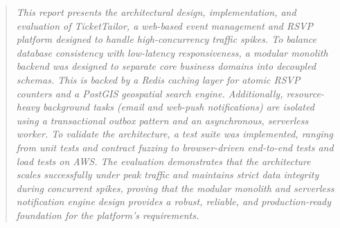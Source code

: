 \begin{abstract}
\textit{This report presents the architectural design, implementation, and evaluation of TicketTailor, a web-based event management and RSVP platform designed to handle high-concurrency traffic spikes. To balance database consistency with low-latency responsiveness, a modular monolith backend was designed to separate core business domains into decoupled schemas. This is backed by a Redis caching layer for atomic RSVP counters and a PostGIS geospatial search engine. Additionally, resource-heavy background tasks (email and web-push notifications) are isolated using a transactional outbox pattern and an asynchronous, serverless worker. To validate the architecture, a test suite was implemented, ranging from unit tests and contract fuzzing to browser-driven end-to-end tests and load tests on AWS. The evaluation demonstrates that the architecture scales successfully under peak traffic and maintains strict data integrity during concurrent spikes, proving that the modular monolith and serverless notification engine design provides a robust, reliable, and production-ready foundation for the platform's requirements.}
\end{abstract}